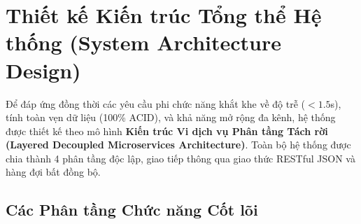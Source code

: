 \section{Thiết kế Kiến trúc Tổng thể Hệ thống (System Architecture Design)}
\label{sec:kien_truc_tong_the}

Để đáp ứng đồng thời các yêu cầu phi chức năng khắt khe về độ trễ ($< 1.5$s), tính toàn vẹn dữ liệu (100\% ACID), và khả năng mở rộng đa kênh, hệ thống được thiết kế theo mô hình \textbf{Kiến trúc Vi dịch vụ Phân tầng Tách rời (Layered Decoupled Microservices Architecture)}. Toàn bộ hệ thống được chia thành 4 phân tầng độc lập, giao tiếp thông qua giao thức RESTful JSON và hàng đợi bất đồng bộ.

\subsection{Các Phân tầng Chức năng Cốt lõi}
\label{subsec:layered_subsystems}

